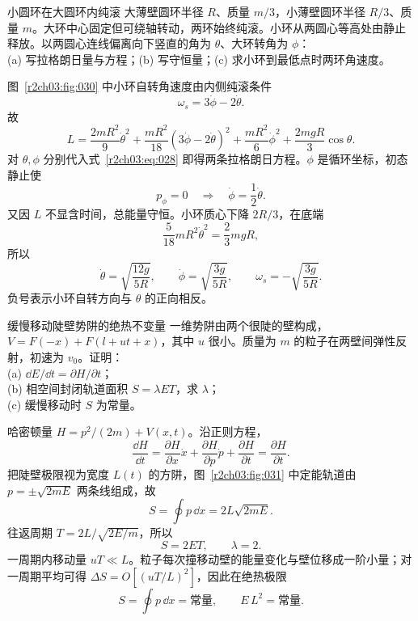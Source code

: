 \begin{practicebox}{小圆环在大圆环内纯滚}
大薄壁圆环半径 $R$、质量 $m/3$，小薄壁圆环半径 $R/3$、质量 $m$。大环中心固定但可绕轴转动，两环始终纯滚。小环从两圆心等高处由静止释放。以两圆心连线偏离向下竖直的角为 $\theta$、大环转角为 $\phi$：\\
(a) 写拉格朗日量与方程；(b) 写守恒量；(c) 求小环到最低点时两环角速度。
\label{r2ch03:pr:014}
\begin{solution}
图~\ref{r2ch03:fig:030} 中小环自转角速度由内侧纯滚条件
\[
 \omega_s=3\dot\phi-2\dot\theta.
\]
故
\[
 L=\frac{2mR^2}{9}\dot\theta^2
 +\frac{mR^2}{18}(3\dot\phi-2\dot\theta)^2
 +\frac{mR^2}{6}\dot\phi^2
 +\frac{2mgR}{3}\cos\theta .
\]
对 $\theta,\phi$ 分别代入式~\eqref{r2ch03:eq:028} 即得两条拉格朗日方程。$\phi$ 是循环坐标，初态静止使
\[
 p_\phi=0\quad\Longrightarrow\quad
 \dot\phi=\frac12\dot\theta .
\]
又因 $L$ 不显含时间，总能量守恒。小环质心下降 $2R/3$，在底端
\[
 \frac{5}{18}mR^2\dot\theta^2=\frac23mgR,
\]
所以
\[
 \boxed{\dot\theta=\sqrt{\frac{12g}{5R}},\qquad
 \dot\phi=\sqrt{\frac{3g}{5R}},\qquad
 \omega_s=-\sqrt{\frac{3g}{5R}}}.
\]
负号表示小环自转方向与 $\theta$ 的正向相反。
\figRollingHoops
\end{solution}
\end{practicebox}

\begin{practicebox}{缓慢移动陡壁势阱的绝热不变量}
一维势阱由两个很陡的壁构成，
$V=F(-x)+F(l+ut+x)$，其中 $u$ 很小。质量为 $m$ 的粒子在两壁间弹性反射，初速为 $v_0$。证明：\\
(a) $\dd E/\dd t=\partial H/\partial t$；\\
(b) 相空间封闭轨道面积 $S=\lambda ET$，求 $\lambda$；\\
(c) 缓慢移动时 $S$ 为常量。
\label{r2ch03:pr:015}
\begin{solution}
哈密顿量 $H=p^2/(2m)+V(x,t)$。沿正则方程，
\[
 \frac{\dd H}{\dd t}
 =\frac{\partial H}{\partial x}\dot x+
 \frac{\partial H}{\partial p}\dot p+
 \frac{\partial H}{\partial t}
 =\frac{\partial H}{\partial t}.
\]
把陡壁极限视为宽度 $L(t)$ 的方阱，图~\ref{r2ch03:fig:031} 中定能轨道由
$p=\pm\sqrt{2mE}$ 两条线组成，故
\[
 S=\oint p\,\dd x=2L\sqrt{2mE}.
\]
往返周期 $T=2L/\sqrt{2E/m}$，所以
\[
 \boxed{S=2ET,\qquad \lambda=2}.
\]
一周期内移动量 $uT\ll L$。粒子每次撞移动壁的能量变化与壁位移成一阶小量；对一周期平均可得
$\Delta S=O[(uT/L)^2]$，因此在绝热极限
\[
 \boxed{S=\oint p\,\dd x=\text{常量}},\qquad
 E\,L^2=\text{常量}.
\]
\figMovingWell
\end{solution}
\end{practicebox}

